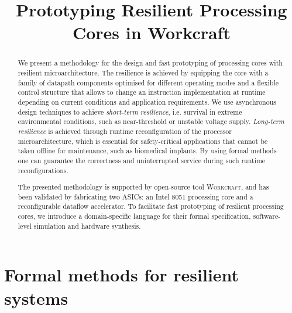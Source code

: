 \documentclass[conference]{IEEEtran}
\begin{document}
\title{Prototyping Resilient Processing Cores in Workcraft}

\vspace{-1mm}
\author{
\vspace{-6mm}
}

\maketitle

\begin{abstract}
We present a methodology for the design and fast prototyping of
processing cores with resilient microarchitecture. The resilience is
achieved by equipping the core with a family of datapath components
optimised for different operating modes and a flexible control
structure that allows to change an instruction implementation at
runtime depending on current conditions and application
requirements. We use asynchronous design techniques to achieve
\emph{short-term resilience}, i.e. survival in extreme environmental
conditions, such as near-threshold or unstable voltage supply.
\emph{Long-term resilience} is achieved through
runtime reconfiguration of the processor microarchitecture, which
is essential for safety-critical applications that cannot be taken
offline for maintenance, such as biomedical implants. By using
formal methods one can guarantee the correctness and uninterrupted
service during such runtime reconfigurations.

The presented methodology is supported by open-source tool
\textsc{Workcraft}, and has been validated by fabricating
two ASICs: an Intel 8051 processing core and a
reconfigurable dataflow accelerator.
To facilitate fast prototyping of resilient processing cores, we
introduce a domain-specific language for their formal specification,
software-level simulation and hardware synthesis.
\end{abstract}


\IEEEpeerreviewmaketitle
\section{Formal methods for resilient systems}
\vspace{-1mm}
\end{document}
